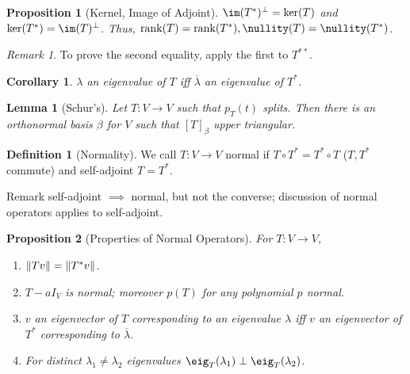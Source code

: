 \documentclass[12pt, oneside]{article}
\theoremstyle{definition}
\newtheorem{defn}{Definition}
\theoremstyle{plain}
\newtheorem{cor}{Corollary}
\newtheorem{prop}{Proposition}
\newtheorem{lemma}{Lemma}
\theoremstyle{remark}
\newtheorem{remark}{Remark}
\begin{document}
\begin{prop}[Kernel, Image of Adjoint]
  $\im(T^\ast)^\perp = \ker(T)$ and $\ker(T^\ast) = \im(T)^\perp$. Thus, $\rank(T) = \rank(T^\ast), \nullity(T) =\nullity(T^\ast)$.
\end{prop}

\begin{remark}
  To prove the second equality, apply the first to $T^{\ast\ast}$.
\end{remark}
\begin{cor}
  $\lambda$ an eigenvalue of $T$ iff $\overline{\lambda}$ an eigenvalue of $T^\ast$.
\end{cor}
\begin{lemma}[Schur's]
  Let $T : V \to V$ such that $p_T(t)$ splits. Then there is an orthonormal basis $\beta$ for $V$ such that $[T]_\beta$ upper triangular.
\end{lemma}

\begin{defn}[Normality]
  We call $T : V \to V$ normal if $T \circ T^\ast = T^\ast \circ T$ ($T,T^\ast$ commute) and self-adjoint $T = T^\ast$.

  Remark self-adjoint $\implies$ normal, but not the converse; discussion of normal operators applies to self-adjoint.
\end{defn}

\begin{prop}[Properties of Normal Operators]
For $T : V\to V$, \begin{enumerate}[label=(\alph*)]
  \item $\norm{Tv} = \norm{T^\ast v}$.
  \item $T - aI_V$ is normal; moreover $p(T)$ for any polynomial $p$ normal.
  \item $v$ an eigenvector of $T$ corresponding to an eigenvalue $\lambda$ iff $v$ an eigenvector of $T^\ast$ corresponding to $\overline{\lambda}$.
  \item For distinct $\lambda_1 \neq \lambda_2$ eigenvalues $\eig_T(\lambda_1) \perp \eig_T(\lambda_2)$.
\end{enumerate}
\end{prop}
\end{document}
